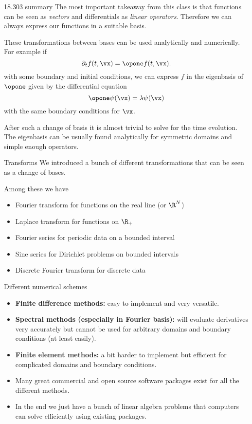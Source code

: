 \begin{frame}{18.303 summary}
	The most important takeaway from this class is that functions can be seen as \emph{vectors} and differentials as \emph{linear operators}. Therefore we can always express our functions in a suitable basis.
	
	\pause
	These transformations between bases can be used analytically and numerically. For example if
	\[ \partial_t f(t,\vx) = \opone f(t,\vx). \]
	with some boundary and initial conditions, we can express $ f $ in the eigenbasis of $ \opone $ given by the differential equation
	\[ \opone \psi(\vx) = \lambda \psi(\vx) \]
	with the same boundary conditions for $ \vx $.
	
	\pause
	After such a change of basis it is almost trivial to solve for the time evolution. The eigenbasis can be usually found analytically for symmetric domains and simple enough operators.
\end{frame}

\begin{frame}{Transforms}
	We introduced a bunch of different transformations that can be seen as a change of bases.
	
	\pause
	Among these we have 
	\begin{itemize}[<+->]
		\item Fourier transform for functions on the real line (or $ \R^N $)
		\item Laplace transform for functions on $ \R_+ $
		\item Fourier series for periodic data on a bounded interval 
		\item Sine series for Dirichlet problems on bounded intervals
		\item Discrete Fourier transform for discrete data
	\end{itemize}
\end{frame}

\begin{frame}{Different numerical schemes}
	\begin{itemize}[<+->]
		\item \textbf{Finite difference methods:} easy to implement and very versatile.
		\item \textbf{Spectral methods (especially in Fourier basis):} will evaluate derivatives very accurately but cannot be used for arbitrary domains and boundary conditions (at least easily).
		\item \textbf{Finite element methods:} a bit harder to implement but efficient for complicated domains and boundary conditions. 
		\item Many great commercial and open source software packages exist for all the different methods.
		\item In the end we just have a bunch of linear algebra problems that computers can solve efficiently using existing packages.
	\end{itemize}
\end{frame}

